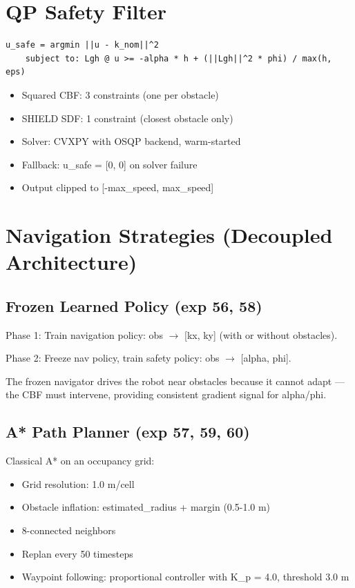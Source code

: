 \documentclass[11pt]{article}
\begin{document}
\section*{QP Safety Filter}

\begin{verbatim}
u_safe = argmin ||u - k_nom||^2
    subject to: Lgh @ u >= -alpha * h + (||Lgh||^2 * phi) / max(h, eps)
\end{verbatim}

\begin{itemize}
\item Squared CBF: 3 constraints (one per obstacle)
\item SHIELD SDF: 1 constraint (closest obstacle only)
\item Solver: CVXPY with OSQP backend, warm-started
\item Fallback: u\_safe = [0, 0] on solver failure
\item Output clipped to [-max\_speed, max\_speed]
\end{itemize}


\section*{Navigation Strategies (Decoupled Architecture)}

\subsection*{Frozen Learned Policy (exp 56, 58)}

Phase 1: Train navigation policy: obs $\rightarrow$ [kx, ky] (with or without obstacles).

Phase 2: Freeze nav policy, train safety policy: obs $\rightarrow$ [alpha, phi].

The frozen navigator drives the robot near obstacles because it cannot adapt --- the CBF must intervene, providing consistent gradient signal for alpha/phi.

\subsection*{A* Path Planner (exp 57, 59, 60)}

Classical A* on an occupancy grid:
\begin{itemize}
\item Grid resolution: 1.0 m/cell
\item Obstacle inflation: estimated\_radius + margin (0.5-1.0 m)
\item 8-connected neighbors
\item Replan every 50 timesteps
\item Waypoint following: proportional controller with K\_p = 4.0, threshold 3.0 m
\end{itemize}
\end{document}
